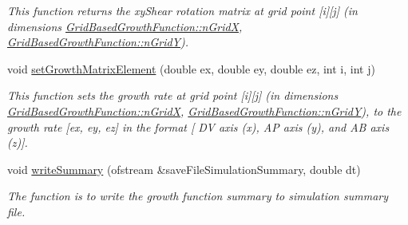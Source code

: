 \begin{DoxyCompactItemize}
\begin{DoxyCompactList}\small\item\em This function returns the xy\+Shear rotation matrix at grid point \mbox{[}i\mbox{]}\mbox{[}j\mbox{]} (in dimensions \hyperlink{classGridBasedGrowthFunction_af872b9963f3a579dcd615c23bcb58a86}{Grid\+Based\+Growth\+Function\+::n\+Grid\+X}, \hyperlink{classGridBasedGrowthFunction_a625bc963a1f1e7d1f1a35dbd0ef51728}{Grid\+Based\+Growth\+Function\+::n\+Grid\+Y}). \end{DoxyCompactList}\item 
\hypertarget{classGridBasedGrowthFunction_a9d01fcbba5732aad966659d4f64c145b}{}void \hyperlink{classGridBasedGrowthFunction_a9d01fcbba5732aad966659d4f64c145b}{set\+Growth\+Matrix\+Element} (double ex, double ey, double ez, int i, int j)\label{classGridBasedGrowthFunction_a9d01fcbba5732aad966659d4f64c145b}

\begin{DoxyCompactList}\small\item\em This function sets the growth rate at grid point \mbox{[}i\mbox{]}\mbox{[}j\mbox{]} (in dimensions \hyperlink{classGridBasedGrowthFunction_af872b9963f3a579dcd615c23bcb58a86}{Grid\+Based\+Growth\+Function\+::n\+Grid\+X}, \hyperlink{classGridBasedGrowthFunction_a625bc963a1f1e7d1f1a35dbd0ef51728}{Grid\+Based\+Growth\+Function\+::n\+Grid\+Y}), to the growth rate \mbox{[}ex, ey, ez\mbox{]} in the format \mbox{[} D\+V axis (x), A\+P axis (y), and A\+B axis (z)\mbox{]}. \end{DoxyCompactList}\item 
void \hyperlink{classGridBasedGrowthFunction_a659418841b4a3bc8be1dec15f95d7b76}{write\+Summary} (ofstream \&save\+File\+Simulation\+Summary, double dt)
\begin{DoxyCompactList}\small\item\em The function is to write the growth function summary to simulation summary file. \end{DoxyCompactList}\end{DoxyCompactItemize}

